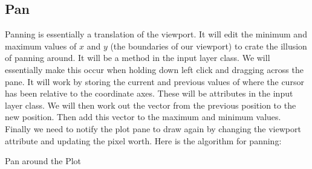\documentclass[../../../../main.tex]{subfiles}
\begin{document}
\subsection{Pan}
Panning is essentially a translation of the viewport. It will edit the minimum and maximum values of $x$ and $y$ (the boundaries of our viewport) to crate the illusion of panning around. It will be a method in the input layer class. We will essentially make this occur when holding down left click and dragging across the pane. It will work by storing the current and previous values of where the cursor has been relative to the coordinate axes. These will be attributes in the input layer class. We will then work out the vector from the previous position to the new position. Then add this vector to the maximum and minimum values. Finally we need to notify the plot pane to draw again by changing the viewport attribute and updating the pixel worth.
Here is the algorithm for panning:
\begin{algorithm}
\DontPrintSemicolon
\caption{Pan around the Plot}
\end{algorithm}
\newpage
\end{document}
